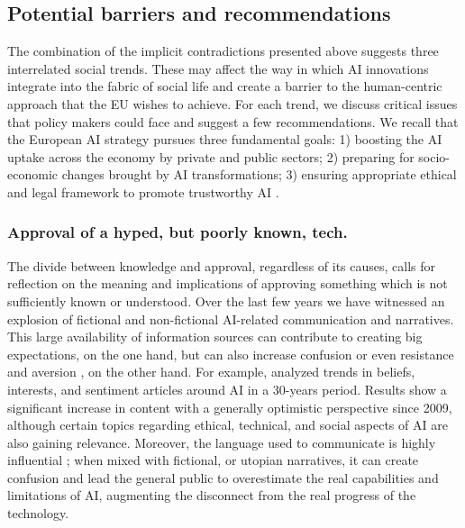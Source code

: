 \documentclass{article}
\begin{document}
\subsection{Potential barriers and recommendations}

The combination of the implicit contradictions presented above suggests three interrelated social trends. These may affect the way in which AI innovations integrate into the fabric of social life and create a barrier to the human-centric approach that the EU wishes to achieve. For each trend, we discuss critical issues that policy makers could face and suggest a few recommendations. We recall that the European AI strategy pursues three fundamental goals: 1) boosting the AI uptake across the economy by private and public sectors; 2) preparing for socio-economic changes brought by AI transformations; 3) ensuring appropriate ethical and legal framework to promote trustworthy AI \cite{ai_agenda}.

\subsubsection{\textbf{Approval of a hyped, but poorly known, tech}.}
The divide between knowledge and approval, regardless of its causes, calls for reflection on the meaning and implications of approving something which is not sufficiently known or understood. Over the last few years we have witnessed an explosion of fictional and non-fictional AI-related communication and narratives. This large availability of information sources can contribute to creating big expectations, on the one hand, but can also increase confusion or even resistance and aversion \cite{longoni2019resistance, dietvorst2015algorithm}, on the other hand. For example, \cite{10.5555/3298239.3298381} analyzed trends in beliefs, interests, and sentiment articles around AI in a 30-years period. Results show a significant increase in content with a generally optimistic perspective since 2009, although certain topics regarding ethical, technical, and social aspects of AI are also gaining relevance. 
Moreover, the language used to communicate is highly influential \cite{TRS}; when mixed with fictional, or utopian narratives, it can create confusion and lead the general public to overestimate the real capabilities and limitations of AI, augmenting the disconnect from the real progress of the technology. 
\end{document}
